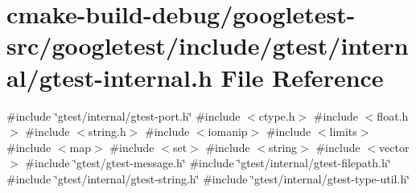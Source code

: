 \hypertarget{gtest-internal_8h}{}\section{cmake-\/build-\/debug/googletest-\/src/googletest/include/gtest/internal/gtest-\/internal.h File Reference}
\label{gtest-internal_8h}
{\ttfamily \#include \char`\"{}gtest/internal/gtest-\/port.\+h\char`\"{}}\newline
{\ttfamily \#include $<$ctype.\+h$>$}\newline
{\ttfamily \#include $<$float.\+h$>$}\newline
{\ttfamily \#include $<$string.\+h$>$}\newline
{\ttfamily \#include $<$iomanip$>$}\newline
{\ttfamily \#include $<$limits$>$}\newline
{\ttfamily \#include $<$map$>$}\newline
{\ttfamily \#include $<$set$>$}\newline
{\ttfamily \#include $<$string$>$}\newline
{\ttfamily \#include $<$vector$>$}\newline
{\ttfamily \#include \char`\"{}gtest/gtest-\/message.\+h\char`\"{}}\newline
{\ttfamily \#include \char`\"{}gtest/internal/gtest-\/filepath.\+h\char`\"{}}\newline
{\ttfamily \#include \char`\"{}gtest/internal/gtest-\/string.\+h\char`\"{}}\newline
{\ttfamily \#include \char`\"{}gtest/internal/gtest-\/type-\/util.\+h\char`\"{}}\newline
